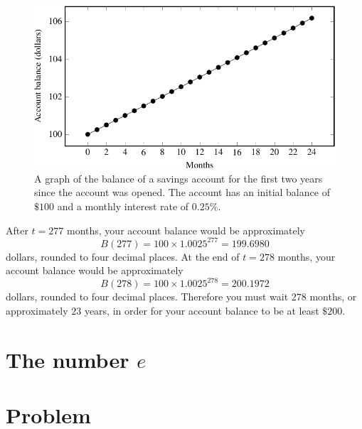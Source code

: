 \documentclass[a4paper,oneside,12pt]{article}
\begin{document}
{\begin{solution}
\begin{figure}[!htbp]
\centering
\includegraphics[scale=1.1]{image/11/interest.pdf}
\caption{%
  A graph of the balance of a savings account for the first two years
  since the account was opened.  The account has an initial balance of
  $\$100$ and a monthly interest rate of $0.25\%$.
}
\label{fig:interest_balance_24_months}
\end{figure}

After $t = 277$ months, your account balance would be approximately
\[
B(277)
=
100 \times 1.0025^{277}
=
199.6980
\]
dollars, rounded to four decimal places.  At the end of $t = 278$
months, your account balance would be approximately
\[
B(278)
=
100 \times 1.0025^{278}
=
200.1972
\]
dollars, rounded to four decimal places.  Therefore you must wait
$278$ months, or approximately $23$ years, in order for your account
balance to be at least $\$200$.
\end{solution}
}{}



\section{The number $e$}


\newpage

\section*{Problem}
\end{document}
